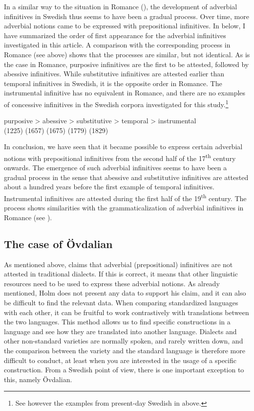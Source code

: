 \documentclass[output=paper]{langscibook}
\begin{document}
In a similar way to the situation in Romance (\citealt{Schulte2007Prepositional,Schulte2007What}), the development of adverbial infinitives in Swedish thus seems to have been a gradual process. Over time, more adverbial notions came to be expressed with prepositional infinitives. In  below, I have summarized the order of first appearance for the adverbial infinitives investigated in this article. A comparison with the corresponding process in Romance (see  above) shows that the processes are similar, but not identical. As is the case in Romance, purposive infinitives are the first to be attested, followed by abessive infinitives. While substitutive infinitives are attested earlier than temporal infinitives in Swedish, it is the opposite order in Romance. The instrumental infinitive has no equivalent in Romance, and there are no examples of concessive infinitives in the Swedish corpora investigated for this study.\footnote{See however the examples from present-day Swedish in  above.}     

\ea  \label{ex:kalm:14}
\gll purposive >  abessive  > substitutive > temporal > instrumental\\
(1225) {} (1657) {} (1675) {} (1779) {} (1829)\\
\z 



In conclusion, we have seen that it became possible to express certain adverbial notions with prepositional infinitives from the second half of the 17\textsuperscript{th} century onwards. The emergence of such adverbial infinitives seems to have been a gradual process in the sense that abessive and substitutive infinitives are attested about a hundred years before the first example of temporal infinitives. Instrumental infinitives are attested during the first half of the 19\textsuperscript{th} century. The process shows similarities with the grammaticalization of adverbial infinitives in Romance (see \citealt{Schulte2007Prepositional,Schulte2007What}). 


\subsection{The case of Övdalian}\label{sec:kalm:4.3}


As mentioned above, \citet[27]{Holm1967} claims that adverbial (prepositional) infinitives are not attested in traditional dialects. If this is correct, it means that other linguistic resources need to be used to express these adverbial notions. As already mentioned, Holm does not present any data to support his claim, and it can also be difficult to find the relevant data. When comparing standardized languages with each other, it can be fruitful to work contrastively with translations between the two languages. This method allows us to find specific constructions in a language and see how they are translated into another language. Dialects and other non-standard varieties are normally spoken, and rarely written down, and the comparison between the variety and the standard language is therefore more difficult to conduct, at least when you are interested in the usage of a specific construction. From a Swedish point of view, there is one important exception to this, namely Övdalian. 
\end{document}
